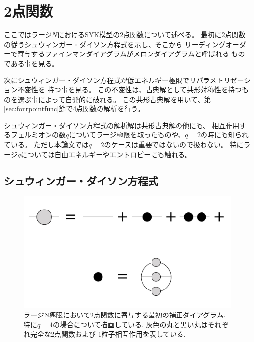 \section{2点関数\label{sec:twopointfunc}}
ここではラージ$N$におけるSYK模型の2点関数について述べる。
最初に2点関数の従うシュウィンガー・ダイソン方程式を示し、そこから
リーディングオーダーで寄与するファインマンダイアグラムがメロンダイアグラムと呼ばれる
ものである事を見る。

次にシュウィンガー・ダイソン方程式が低エネルギー極限でリパラメトリゼーション不変性を
持つ事を見る。
この不変性は、古典解として共形対称性を持つものを選ぶ事によって自発的に破れる。
この共形古典解を用いて、第\ref{sec:fourpointfunc}節で4点関数の解析を行う。

シュウィンガー・ダイソン方程式の解析解は共形古典解の他にも、
相互作用するフェルミオンの数$q$についてラージ極限を取ったものや、$q=2$の時にも知られている。
ただし本論文では$q=2$のケースは重要ではないので扱わない。
特にラージ$q$については自由エネルギーやエントロピーにも触れる。

\subsection{シュウィンガー・ダイソン方程式}
\begin{figure}[ht]
  \centering
  \includegraphics[width=14cm]{figures/melonDiagram}
  \caption{ラージN極限において2点関数に寄与する最初の補正ダイアグラム.
  特に$q=4$の場合について描画している. 灰色の丸と黒い丸はそれぞれ完全な2点関数および
  1粒子相互作用を表している.}
  \label{fig:melonDiagram}
\end{figure}

